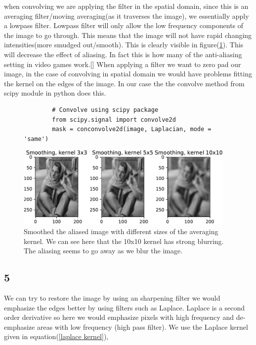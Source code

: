 {when convolving we are applying the filter in the spatial domain, since this is an averaging filter/moving averaging(as it traverses the image), we essentially apply a lowpass filter. Lowpass filter will only allow the low frequency components of the image to go through. This means that the image will not have rapid changing intensities(more smudged out/smooth). This is clearly visible in figure(\ref{smooth}). This will decrease the effect of aliasing. In fact this is how many of the anti-aliasing setting in video games work.[\cite{wiki}]
When applying a filter we want to zero pad our image, in the case of convolving in spatial domain we would have problems fitting the kernel on the edges of the image. In our case the the convolve method from scipy module in python does this.

\begin{figure}[!htb]
    \begin{lstlisting}
        # Convolve using scipy package
        from scipy.signal import convolve2d
        mask = conconvolve2d(image, Laplacian, mode = 'same')
    \end{lstlisting}
\end{figure}

\begin{figure}[!htb]
    {\centering
        \includegraphics[width=0.95\textwidth]{smoothing.pdf}
        \caption{Smoothed the aliased image with different sizes of the averaging kernel. We can see here that the 10x10 kernel has strong blurring. The aliasing seems to go away as we blur the image.}
        \label{smooth}
    \par}
    \end{figure}

\subsection{5}

We can try to restore the image by using an sharpening filter we would emphasize the edges better by using filters such as Laplace. Laplace is a second order derivative so here we would emphasize pixels with high frequency and de-emphasize areas with low frequency (high pass filter). We use the Laplace kernel given in equation(\ref{laplace kernel}),

}
